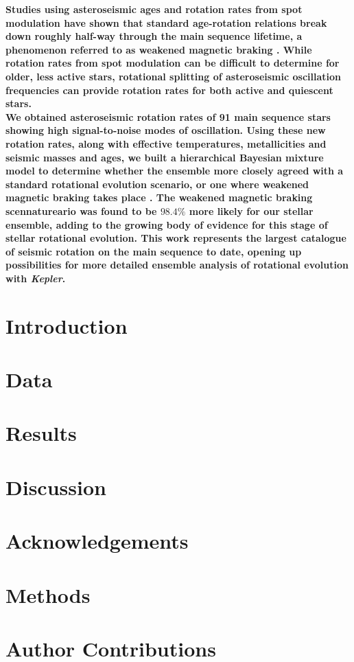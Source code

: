 \documentclass[12pt]{article}
\begin{document}
\textbf{Studies using asteroseismic ages and rotation rates from spot modulation have shown that standard age-rotation relations break down roughly half-way through the main sequence lifetime, a phenomenon referred to as weakened magnetic braking \cite{vansaders+2016}. While rotation rates from spot modulation can be difficult to determine for older, less active stars, rotational splitting of asteroseismic oscillation frequencies can provide rotation rates for both active and quiescent stars.\\
We obtained asteroseismic rotation rates of 91 main sequence stars showing high signal-to-noise modes of oscillation.
Using these new rotation rates, along with effective temperatures, metallicities and seismic masses and ages, we built a hierarchical Bayesian mixture model to determine whether the ensemble more closely agreed with a standard rotational evolution scenario, or one where weakened magnetic braking takes place \cite{vansaders+pinsonneault2013}. The weakened magnetic braking scennatureario was found to be $98.4\%$ more likely for our stellar ensemble, adding to the growing body of evidence for this stage of stellar rotational evolution. This work represents the largest catalogue of seismic rotation on the main sequence to date, opening up possibilities for more detailed ensemble analysis of rotational evolution with \textit{Kepler}.}

\section{Introduction} %


\section{Data}


\section{Results}


\section{Discussion}



\section*{Acknowledgements}

\section*{Methods}

\section*{Author Contributions}
\end{document}
